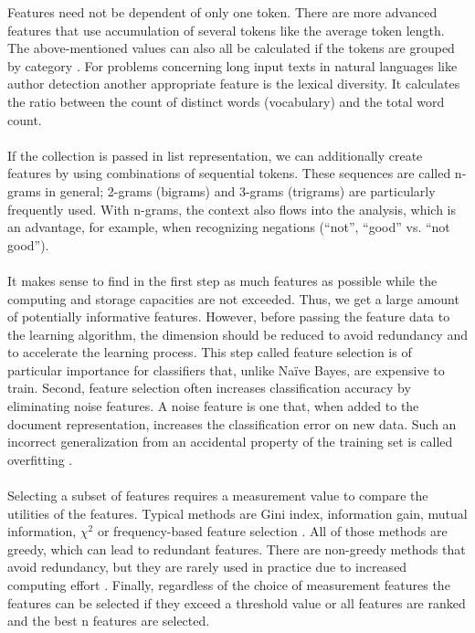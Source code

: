\documentclass[article,type=msc,colorback,accentcolor=tud7b]{tudthesis}
\begin{document}
    Features need not be dependent of only one token. There are more advanced features that use accumulation of several tokens like the average token length. The above-mentioned values can also all be calculated if the tokens are grouped by category \autocite{Wang2010}. For problems concerning long input texts in natural languages like author detection another appropriate feature is the lexical diversity. It calculates the ratio between the count of distinct words (vocabulary) and the total word count. \\\\
    If the collection is passed in list representation, we can additionally create features by using combinations of sequential tokens. These sequences are called n-grams in general; 2-grams (bigrams) and 3-grams (trigrams) are particularly frequently used. With n-grams, the context also flows into the analysis, which is an advantage, for example, when recognizing negations (“not”, “good” vs. “not good”). \\\\
    It makes sense to find in the first step as much features as possible while the computing and storage capacities are not exceeded. Thus, we get a large amount of potentially informative features. However, before passing the feature data to the learning algorithm, the dimension should be reduced to avoid redundancy and to accelerate the learning process. This step called feature selection is of particular importance for classifiers that, unlike Naïve Bayes, are expensive to train. Second, feature selection often increases classification accuracy by eliminating noise features. A noise feature is one that, when added to the document representation, increases the classification error on new data. Such an incorrect generalization from an accidental property of the training set is called overfitting \autocite[section~13.5]{Manning2008}. \\\\
    Selecting a subset of features requires a measurement value to compare the utilities of the features. Typical methods are Gini index, information gain, mutual information, $\chi^2$ or frequency-based feature selection \autocite[section~2.1]{Aggarwal2012}. All of those methods are greedy, which can lead to redundant features. There are non-greedy methods that avoid redundancy, but they are rarely used in practice due to increased computing effort \autocite[section~13.5]{Manning2008}. Finally, regardless of the choice of measurement features the features can be selected if they exceed a threshold value or all features are ranked and the best n features are selected. \\\\
\end{document}
